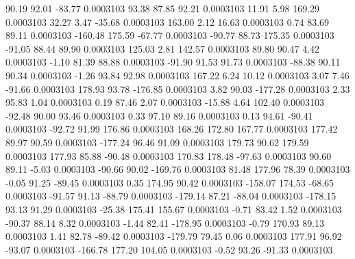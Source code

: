        90.19       92.01      -83.77     0.0003103
       93.38       87.85       92.21     0.0003103
       11.91        5.98      169.29     0.0003103
       32.27        3.47      -35.68     0.0003103
      163.00        2.12       16.63     0.0003103
        0.74       83.69       89.11     0.0003103
     -160.48      175.59      -67.77     0.0003103
      -90.77       88.73      175.35     0.0003103
      -91.05       88.44       89.90     0.0003103
      125.03        2.81      142.57     0.0003103
       89.80       90.47        4.42     0.0003103
       -1.10       81.39       88.88     0.0003103
      -91.90       91.53       91.73     0.0003103
      -88.38       90.11       90.34     0.0003103
       -1.26       93.84       92.98     0.0003103
      167.22        6.24       10.12     0.0003103
        3.07        7.46      -91.66     0.0003103
      178.93       93.78     -176.85     0.0003103
        3.82       90.03     -177.28     0.0003103
        2.33       95.83        1.04     0.0003103
        0.19       87.46        2.07     0.0003103
      -15.88        4.64      102.40     0.0003103
      -92.48       90.00       93.46     0.0003103
        0.33       97.10       89.16     0.0003103
        0.13       94.61      -90.41     0.0003103
      -92.72       91.99      176.86     0.0003103
      168.26      172.80      167.77     0.0003103
      177.42       89.97       90.59     0.0003103
     -177.24       96.46       91.09     0.0003103
      179.73       90.62      179.59     0.0003103
      177.93       85.88      -90.48     0.0003103
      170.83      178.48      -97.63     0.0003103
       90.60       89.11       -5.03     0.0003103
      -90.66       90.02     -169.76     0.0003103
       81.48      177.96       78.39     0.0003103
       -0.05       91.25      -89.45     0.0003103
        0.35      174.95       90.42     0.0003103
     -158.07      174.53      -68.65     0.0003103
      -91.57       91.13      -88.79     0.0003103
     -179.14       87.21      -88.04     0.0003103
     -178.15       93.13       91.29     0.0003103
      -25.38      175.41      155.67     0.0003103
       -0.71       83.42        1.52     0.0003103
      -90.37       88.14        8.32     0.0003103
       -1.44       82.41     -178.95     0.0003103
       -0.79      170.93       89.13     0.0003103
        1.41       82.78      -89.42     0.0003103
     -179.79       79.45        0.06     0.0003103
      177.91       96.92      -93.07     0.0003103
     -166.78      177.20      104.05     0.0003103
       -0.52       93.26      -91.33     0.0003103
